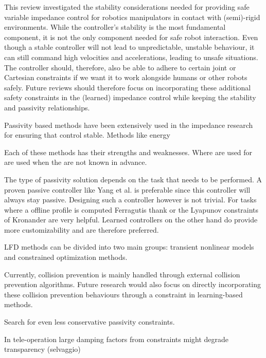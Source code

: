 This review investigated the stability considerations needed for providing safe variable impedance control for robotics manipulators in contact with (semi)-rigid environments. While the controller's stability is the most fundamental component, it is not the only component needed for safe robot interaction. Even though a stable controller will not lead to unpredictable, unstable behaviour, it can still command high velocities and accelerations, leading to unsafe situations. The controller should, therefore, also be able to adhere to certain joint or Cartesian constraints if we want it to work alongside humans or other robots safely. Future reviews should therefore focus on incorporating these additional safety constraints in the (learned) impedance control while keeping the stability and passivity relationships.

Passivity based methods have been extensively used in the impedance research for ensuring that control stable. Methods like energy

Each of these methods has their strengths and weaknesses. Where are used for are used when the are not known in advance.


The type of passivity solution depends on the task that needs to be performed. A proven passive controller like \cite{yangHumanlikeAdaptationForce2011} Yang et al. is preferable since this controller will always stay passive. Designing such a controller however is not trivial. For tasks where a offline profile is computed \cite{ferragutiTankbasedApproachImpedance2013} Ferragutis thank or the Lyapunov constraints of \cite{kronanderStabilityConsiderationsVariable2016} Kronander are very helpful. Learned controllers on the other hand do provide more customizability and are therefore preferred.


LFD methods can be divided into two main groups: transient nonlinear models and constrained optimization methods.


Currently, collision prevention is mainly handled through external collision prevention algorithms. Future research would also focus on directly incorporating these collision prevention behaviours through a constraint in learning-based methods.


Search for even less conservative passivity constraints.


In tele-operation large damping factors from constraints might degrade transparency (selvaggio)


